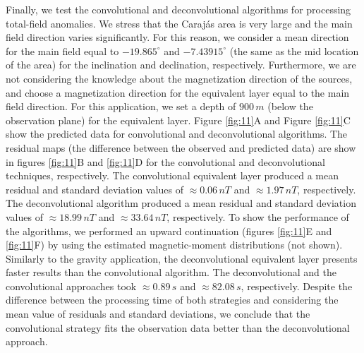 Finally, we test the convolutional and deconvolutional algorithms for processing total-field anomalies. 
We stress that the Carajás area is very large and the main field direction varies significantly. 
For this reason, we consider a mean direction for the main field equal to $-19.865^{\circ}$ and $-7.43915^{\circ}$ 
(the same as the mid location of the area) for the inclination and declination, respectively. 
Furthermore, we are not considering the knowledge about the magnetization direction of the sources, and choose a magnetization 
direction for the equivalent layer equal to the main field direction. For this application, we set a depth of $900 \, m$ 
(below the observation plane) for the equivalent layer. Figure \ref{fig:11}A and Figure \ref{fig:11}C show the predicted data 
for convolutional and deconvolutional algorithms. The residual maps (the difference between the observed and predicted data) are 
show in figures \ref{fig:11}B and \ref{fig:11}D for the convolutional and deconvolutional techniques, respectively. 
The convolutional equivalent layer produced a mean residual and standard deviation values of $\approx 0.06 \, nT$ and $\approx 1.97 \, nT$, respectively. 
The deconvolutional algorithm produced a mean residual and standard deviation values of $\approx 18.99 \, nT$ and $\approx 33.64 \, nT$, respectively. 
To show the performance of the algorithms, we performed an upward continuation (figures \ref{fig:11}E and \ref{fig:11}F) by using the 
estimated magnetic-moment distributions (not shown). Similarly to the gravity application, the deconvolutional equivalent layer presents 
faster results than the convolutional algorithm. The deconvolutional and the convolutional approaches took $\approx 0.89 \, s$ and $\approx 82.08 \, s$, respectively. Despite the difference between the processing time of both strategies and considering the mean value of residuals and standard 
deviations, we conclude that the convolutional strategy fits the observation data better than the deconvolutional approach.




